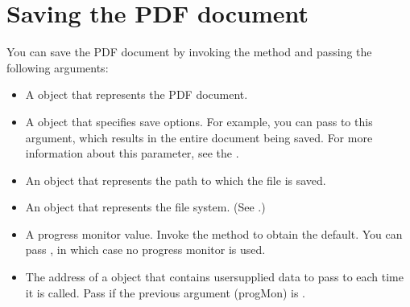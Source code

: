 \documentclass[letterpaper,12pt,english,openany,oneside]{sphinxmanual}
\begin{document}
\section{Saving the PDF document}
\label{\detokenize{Plugins_Insertext:saving-the-pdf-document}}
You can save the PDF document by invoking the  method and passing the following arguments:
\begin{itemize}
\item {} 
A  object that represents the PDF document.

\item {} 
A  object that specifies save options. For example, you can pass  to this argument, which results in the entire document being saved. For more information about this parameter, see the .

\item {} 
An  object that represents the path to which the file is saved.

\item {} 
An  object that represents the file system. (See .)

\item {} 
A progress monitor value. Invoke the  method to obtain the default. You can pass , in which case no progress monitor is used.

\item {} 
The address of a  object that contains user\sphinxhyphen{}supplied data to pass to  each time it is called. Pass  if the previous argument (progMon) is .

\end{itemize}
\end{document}
